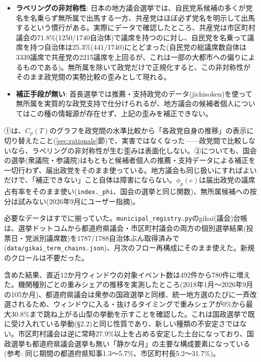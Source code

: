 \documentclass[a4paper,11pt]{ltjsarticle}
\begin{document}
\begin{itemize}
  \item \textbf{ラベリングの非対称性}: 日本の地方議会選挙では、自民党系候補の多くが党名を名乗らず無所属で出馬する一方、共産党はほぼ必ず党名を明示して出馬するという慣行がある。実際にデータで確認したところ、共産党は市区町村議会の71.8\%(1250/1740自治体)で議席を持つのに対し、自民党を名乗って議席を持つ自治体は25.3\%(441/1740)にとどまった(自民党の総議席数自体は3339議席で共産党の2215議席を上回るが、これは一部の大都市への偏りによるものである)。無所属を除いて政党だけで正規化すると、この非対称性がそのまま政党間の実勢比較の歪みとして現れる。
  \item \textbf{補正手段が無い}: 首長選挙では推薦・支持政党のデータ(jichisoken)を使って無所属を実質的な政党支持で仕分けられるが、地方議会の候補者個人についてはこの種の情報源が存在せず、上記の歪みを補正できない。
\end{itemize}

①は、$C_p(T)$のグラフを政党間の水準比較から「各政党自身の推移」の表示に切り替えたこと(\ref{sec:rationale}節)で、実害ではなくなった——政党間で比較しないなら、ラベリングの非対称性が生む歪みは表面化しない。②についても、国会の選挙(衆議院・参議院)はもともと候補者個人の推薦・支持データによる補正を一切行わず、届出政党をそのまま使っている。地方議会も同じ扱いにすればよいだけで、「補正できない」こと自体は障害にならない。$\phi_p(e)$は届出政党の議席占有率をそのまま使い(\texttt{index.\_phi}、国会の選挙と同じ関数)、無所属候補への按分は試みない(2026年9月にユーザー指摘)。

必要なデータはすでに揃っていた。\texttt{municipal\_registry.py}のgikai(議会)台帳は、選挙ドットコムから都道府県議会・市区町村議会の両方の個別選挙結果(投票日・党派別議席数)を1787/1788自治体ぶん取得済みで(\texttt{data/gikai\_term\_chains.json})、月次のフロー再構成にそのまま使えた。新規のクロールは不要だった。

含めた結果、直近12か月ウィンドウの対象イベント数は492件から780件に増えた。機関種別ごとの重みシェアの推移を実測したところ(2018年1月〜2026年9月の105か月)、都道府県議会は衆参の国政選挙と同様、統一地方選のたびに一斉改選されるため、ウィンドウに入る・抜けるタイミングで重みシェアが0\%から最大30.8\%まで跳ね上がる山型の挙動を示すことを確認した。これは国政選挙で既に受け入れている挙動(\S2.2)と同じ性質であり、新しい種類の不安定さではない。市区町村議会は逆に常時27.9\%以上を占める安定した土台になっており、国政選挙も都道府県議会選挙も無い「静かな月」の主要な構成要素になっている(参考: 同じ期間の都道府県知事1.3〜5.7\%、市区町村長5.2〜31.7\%)。
\end{document}
